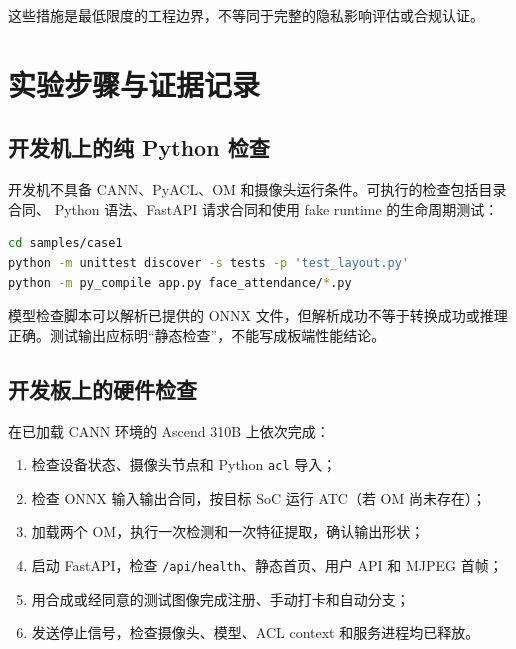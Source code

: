 这些措施是最低限度的工程边界，不等同于完整的隐私影响评估或合规认证。

\section{实验步骤与证据记录}\label{ux5b9eux9a8cux6b65ux9aa4ux4e0eux8bc1ux636eux8bb0ux5f55}

\subsection{开发机上的纯 Python
检查}\label{ux5f00ux53d1ux673aux4e0aux7684ux7eaf-python-ux68c0ux67e5}

开发机不具备 CANN、PyACL、OM
和摄像头运行条件。可执行的检查包括目录合同、 Python 语法、FastAPI
请求合同和使用 fake runtime 的生命周期测试：

\begin{lstlisting}[language=bash]
cd samples/case1
python -m unittest discover -s tests -p 'test_layout.py'
python -m py_compile app.py face_attendance/*.py
\end{lstlisting}

模型检查脚本可以解析已提供的 ONNX 文件，但解析成功不等于转换成功或推理
正确。测试输出应标明``静态检查''，不能写成板端性能结论。

\subsection{开发板上的硬件检查}\label{ux5f00ux53d1ux677fux4e0aux7684ux786cux4ef6ux68c0ux67e5}

在已加载 CANN 环境的 Ascend 310B 上依次完成：

\begin{enumerate}
\def\labelenumi{\arabic{enumi}.}
\tightlist
\item
  检查设备状态、摄像头节点和 Python \passthrough{\lstinline!acl!} 导入；
\item
  检查 ONNX 输入输出合同，按目标 SoC 运行 ATC（若 OM 尚未存在）；
\item
  加载两个 OM，执行一次检测和一次特征提取，确认输出形状；
\item
  启动 FastAPI，检查
  \passthrough{\lstinline!/api/health!}、静态首页、用户 API 和 MJPEG
  首帧；
\item
  用合成或经同意的测试图像完成注册、手动打卡和自动分支；
\item
  发送停止信号，检查摄像头、模型、ACL context 和服务进程均已释放。
\end{enumerate}

